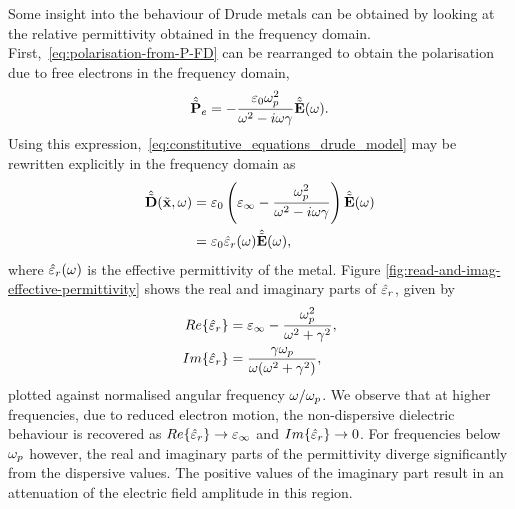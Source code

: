 Some insight into the behaviour of Drude metals can be obtained by looking at
the relative permittivity obtained in the frequency domain.
First,~\eqref{eq:polarisation-from-P-FD} can be rearranged to obtain the
polarisation due to free electrons in the frequency domain,
\begin{equation}
  \hat{\tilde{\mathbf{P}}}_e = - \frac{\varepsilon_0 \omega_p^2}{\omega^2 - i \omega \gamma } \hat{\tilde{\mathbf{E}}}(\omega) .
  \label{eq:polarisation-field-freq-domain}
\end{equation}
Using this expression,~\eqref{eq:constitutive_equations_drude_model} may be
rewritten explicitly in the frequency domain as
\begin{equation}
  \begin{split}
    \hat{\tilde{\mathbf{D}}}(\tilde{\mathbf{x}},\omega) &= \varepsilon_0 \left( \varepsilon_{\infty} - \frac{\omega_p^2 }{\omega^2 - i \omega \gamma } \right) \hat{\tilde{\mathbf{E}}}(\omega) \\
    &= \varepsilon_0 \hat{\varepsilon}_r (\omega) \hat{\tilde{\mathbf{E}}}(\omega) ,
  \end{split}
\end{equation}
where $\hat{\varepsilon}_r(\omega)$ is the effective permittivity of the metal. Figure
\ref{fig:read-and-imag-effective-permittivity} shows the real and imaginary
parts of $\hat{\varepsilon}_r$, given by
\begin{subequations}
  \begin{align}
    Re\{ \hat{\varepsilon}_r \} &= \varepsilon_{\infty} - \frac{\omega_p^2}{\omega^2 + \gamma^2}, \\
    Im\{ \hat{\varepsilon}_r \} &= \frac{\gamma \omega_p}{\omega ( \omega^2 + \gamma^2) } ,
  \end{align}
\end{subequations}
plotted against normalised angular frequency $\omega / \omega_p$. We observe
that at higher frequencies, due to reduced electron motion, the non-dispersive
dielectric behaviour is recovered as $Re\{\hat{\varepsilon}_r\} \to \varepsilon_{\infty}$ and
$Im\{\hat{\varepsilon}_r\} \to 0$. For frequencies below $\omega_p$ however, the real
and imaginary parts of the permittivity diverge significantly from the
dispersive values. The positive values of the imaginary part result in an
attenuation of the electric field amplitude in this region.

